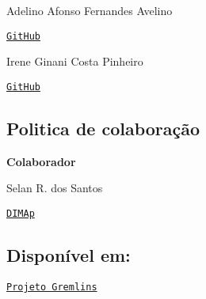 Adelino Afonso Fernandes Avelino
\begin{DoxyItemize}
\item \href{https://github.com/aafavelino}{\tt Git\+Hub}
\end{DoxyItemize}

Irene Ginani Costa Pinheiro
\begin{DoxyItemize}
\item \href{https://github.com/IreneGinani}{\tt Git\+Hub}
\end{DoxyItemize}

\subsection*{Politica de colaboração}

{\bfseries Colaborador}

Selan R. dos Santos
\begin{DoxyItemize}
\item \href{https://www.dimap.ufrn.br/~selan/index.html}{\tt D\+I\+M\+Ap}
\end{DoxyItemize}

\subsection*{Disponível em\+:}

\href{https://github.com/aafavelino/GREMLINS}{\tt Projeto Gremlins} 